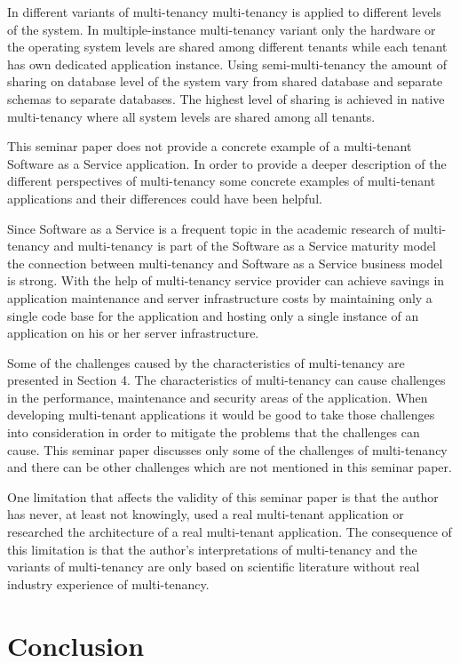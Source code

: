 \documentclass[conference]{sasmoota2017}
\begin{document}
In different variants of multi-tenancy multi-tenancy is applied to different levels of the system. In multiple-instance multi-tenancy variant only the hardware or the operating system levels are shared among different tenants while each tenant has own dedicated application instance. Using semi-multi-tenancy the amount of sharing on database level of the system vary from shared database and separate schemas to separate databases. The highest level of sharing is achieved in native multi-tenancy where all system levels are shared among all tenants. 

This seminar paper does not provide a concrete example of a multi-tenant Software as a Service application. In order to provide a deeper description of the different perspectives of multi-tenancy some concrete examples of multi-tenant applications and their differences could have been helpful. 

Since Software as a Service is a frequent topic in the academic research of multi-tenancy and multi-tenancy is part of the Software as a Service maturity model the connection between multi-tenancy and Software as a Service business model is strong. With the help of multi-tenancy service provider can achieve savings in application maintenance and server infrastructure costs by maintaining only a single code base for the application and hosting only a single instance of an application on his or her server infrastructure. 

Some of the challenges caused by the characteristics of multi-tenancy are presented in Section 4. The characteristics of multi-tenancy can cause challenges in the performance, maintenance and security areas of the application. When developing multi-tenant applications it would be good to take those challenges into consideration in order to mitigate the problems that the challenges can cause. This seminar paper discusses only some of the challenges of multi-tenancy and there can be other challenges which are not mentioned in this seminar paper.

One limitation that affects the validity of this seminar paper is that the author has never, at least not knowingly, used a real multi-tenant application or researched the architecture of a real multi-tenant application. The consequence of this limitation is that the author's interpretations of multi-tenancy and the variants of multi-tenancy are only based on scientific literature without real industry experience of multi-tenancy. 

\section{Conclusion}
\end{document}
